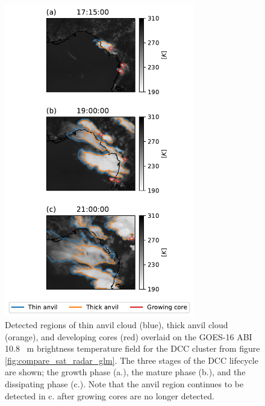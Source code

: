 \documentclass[amt, manuscript]{copernicus}
\begin{document}
\begin{figure}[t]
    \includegraphics[width=8.3cm]{figure08.pdf}
    \caption{Detected regions of thin anvil cloud (blue), thick anvil cloud (orange), and developing cores (red) overlaid on the GOES-16 ABI 10.8 \unit{\mu m} brightness temperature field for the DCC cluster from figure \ref{fig:compare_sat_radar_glm}. The three stages of the DCC lifecycle are shown; the growth phase (a.), the mature phase (b.), and the dissipating phase (c.). Note that the anvil region continues to be detected in c. after growing cores are no longer detected.}
    \label{fig:detected_anvils}
\end{figure}
\end{document}

